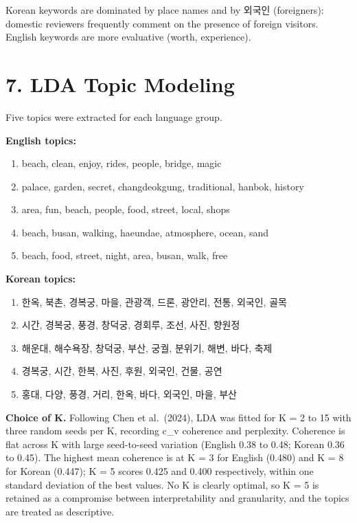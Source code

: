 \documentclass[11pt,a4paper]{article}
\begin{document}
Korean keywords are dominated by place names and by 외국인 (foreigners):
domestic reviewers frequently comment on the presence of foreign visitors.
English keywords are more evaluative (worth, experience).

\section*{7. LDA Topic Modeling}

Five topics were extracted for each language group.

\textbf{English topics:}
\begin{enumerate}\itemsep2pt
  \item beach, clean, enjoy, rides, people, bridge, magic
  \item palace, garden, secret, changdeokgung, traditional, hanbok, history
  \item area, fun, beach, people, food, street, local, shops
  \item beach, busan, walking, haeundae, atmosphere, ocean, sand
  \item beach, food, street, night, area, busan, walk, free
\end{enumerate}

\textbf{Korean topics:}
\begin{enumerate}\itemsep2pt
  \item 한옥, 북촌, 경복궁, 마을, 관광객, 드론, 광안리, 전통, 외국인, 골목
  \item 시간, 경복궁, 풍경, 창덕궁, 경회루, 조선, 사진, 향원정
  \item 해운대, 해수욕장, 창덕궁, 부산, 궁궐, 분위기, 해변, 바다, 축제
  \item 경복궁, 시간, 한복, 사진, 후원, 외국인, 건물, 공연
  \item 홍대, 다양, 풍경, 거리, 한옥, 바다, 외국인, 마을, 부산
\end{enumerate}

\textbf{Choice of K.} Following Chen et al.\ (2024), LDA was fitted for
K = 2 to 15 with three random seeds per K, recording c\_v coherence and
perplexity. Coherence is flat across K with large seed-to-seed variation
(English 0.38 to 0.48; Korean 0.36 to 0.45). The highest mean coherence
is at K = 3 for English (0.480) and K = 8 for Korean (0.447); K = 5 scores
0.425 and 0.400 respectively, within one standard deviation of the best
values. No K is clearly optimal, so K = 5 is retained as a compromise
between interpretability and granularity, and the topics are treated as
descriptive.
\end{document}
